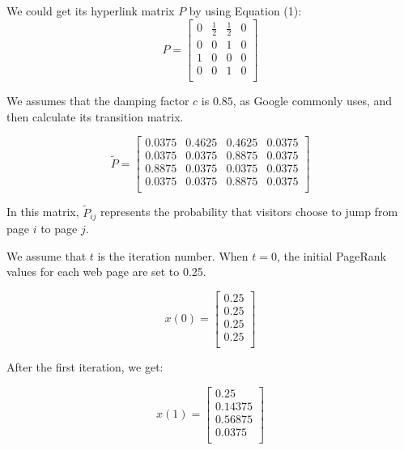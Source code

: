 \documentclass[lettersize,journal,12pt,conference]{IEEEtran}
\begin{document}
We could get its hyperlink matrix $P$ by using Equation (1):
\begin{equation}
	\label{eq:12}
	P = \begin{bmatrix}
		0 & \frac{1}{2} & \frac{1}{2} & 0 \\
		0 & 0 & 1 & 0 \\
		1 & 0 & 0 & 0 \\
		0 & 0 & 1 & 0 \\
		\end{bmatrix}
\end{equation}

We assumes that the damping factor $c$ is $0.85$, as Google commonly uses, and then calculate its transition matrix.

\begin{equation}
	\label{eq:13}
	\widetilde{P} = \begin{bmatrix}
		0.0375 & 0.4625 & 0.4625 & 0.0375 \\
		0.0375 & 0.0375 & 0.8875 & 0.0375 \\
		0.8875 & 0.0375 & 0.0375 & 0.0375 \\
		0.0375 & 0.0375 & 0.8875 & 0.0375 \\
		\end{bmatrix}
\end{equation}

In this matrix, $\widetilde{P}_{ij}$ represents the probability that visitors choose to jump from page $i$ to page $j$.

We assume that $t$ is the iteration number. When $t = 0$, the initial PageRank values for each web page are set to 0.25.

\begin{equation}
	\label{eq:14}
	x(0) = \begin{bmatrix}
		0.25 \\
		0.25 \\
		0.25 \\
		0.25 \\
		\end{bmatrix}
\end{equation}

After the first iteration, we get:

\begin{equation}
	\label{eq:15}
	x(1) = \begin{bmatrix}
		0.25 \\
		0.14375 \\
		0.56875 \\
		0.0375 \\
		\end{bmatrix}
\end{equation}
\end{document}
